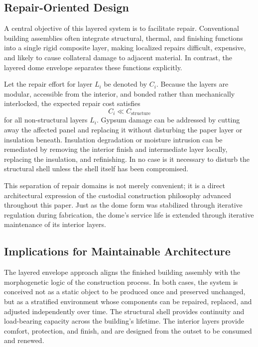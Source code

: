 \documentclass[12pt,a4paper]{article}
\begin{document}
\subsection{Repair-Oriented Design}

A central objective of this layered system is to facilitate repair.
Conventional building assemblies often integrate structural, thermal,
and finishing functions into a single rigid composite layer, making
localized repairs difficult, expensive, and likely to cause collateral
damage to adjacent material. In contrast, the layered dome envelope
separates these functions explicitly.

Let the repair effort for layer $L_i$ be denoted by $C_i$. Because
the layers are modular, accessible from the interior, and bonded rather
than mechanically interlocked, the expected repair cost satisfies
\begin{equation}
C_i \ll C_{\mathrm{structure}}
\end{equation}
for all non-structural layers $L_i$. Gypsum damage can be addressed by
cutting away the affected panel and replacing it without disturbing the
paper layer or insulation beneath. Insulation degradation or moisture
intrusion can be remediated by removing the interior finish and
intermediate layer locally, replacing the insulation, and refinishing.
In no case is it necessary to disturb the structural shell unless the
shell itself has been compromised.

This separation of repair domains is not merely convenient; it is a
direct architectural expression of the custodial construction philosophy
advanced throughout this paper. Just as the dome form was stabilized
through iterative regulation during fabrication, the dome's service life
is extended through iterative maintenance of its interior layers.

\subsection{Implications for Maintainable Architecture}

The layered envelope approach aligns the finished building assembly with
the morphogenetic logic of the construction process. In both cases,
the system is conceived not as a static object to be produced once and
preserved unchanged, but as a stratified environment whose components
can be repaired, replaced, and adjusted independently over time. The
structural shell provides continuity and load-bearing capacity across
the building's lifetime. The interior layers provide comfort,
protection, and finish, and are designed from the outset to be
consumed and renewed.
\end{document}
